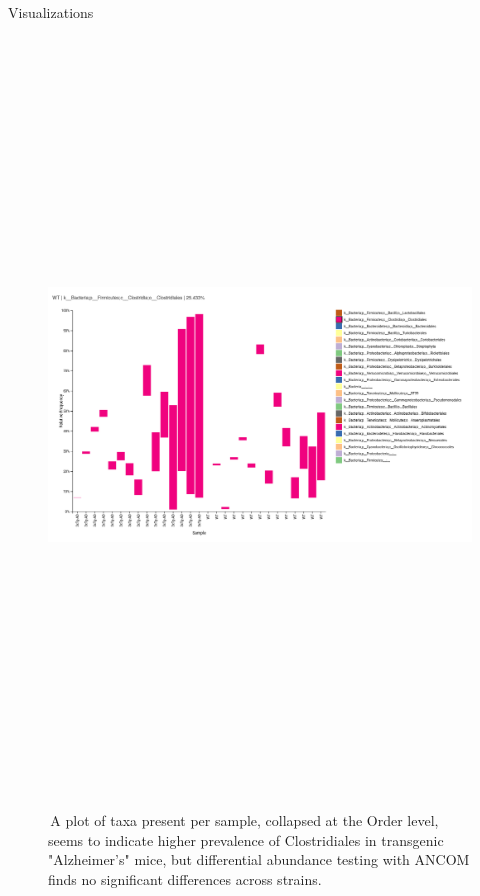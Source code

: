 \documentclass[final]{beamer}
\newlength{\colwidth}
\begin{document}
\begin{frame}[t]
\begin{columns}[t]
\begin{column}{\colwidth}
\begin{block}{Visualizations}
    \begin{figure}[tph!]
      {\includegraphics[height=20cm]{assets/taxa_barplot}}
      \caption{\,A plot of taxa present per sample, collapsed at the Order
      level, seems to indicate higher prevalence of Clostridiales in
      transgenic "Alzheimer’s" mice, but differential abundance testing with
      ANCOM finds no significant differences across strains.}
      \label{fig:q2studio}
    \end{figure}
  \end{block}


\end{column}
\end{columns}
\end{frame}
\end{document}
